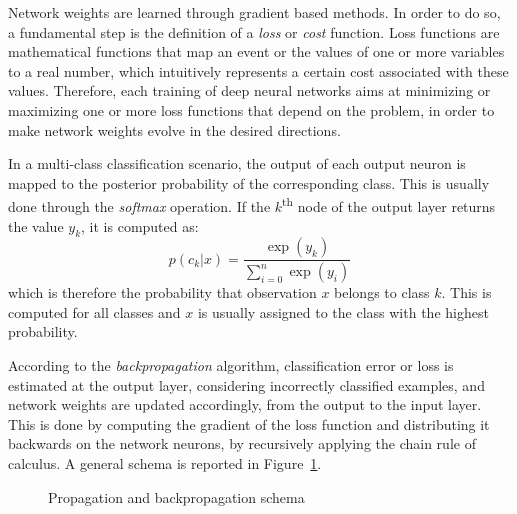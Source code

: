 \documentclass[%
    corpo=12pt,
    twoside,
    stile=classica,   
    tipotesi=magistrale,
    evenboxes,
    english,
	numerazioneromana,
]{toptesi}
\begin{document}
\bigskip
Network weights are learned through gradient based methods. In order to do so, a fundamental step is the definition of a \textit{loss} or \textit{cost} function. Loss functions are mathematical functions that map an event or the values of one or more variables to a real number, which intuitively represents a certain cost associated with these values. Therefore, each training of deep neural networks aims at minimizing or maximizing one or more loss functions that depend on the problem, in order to make network weights evolve in the desired directions. 

\medskip
In a multi-class classification scenario, the output of each output neuron is mapped to the posterior probability of the corresponding class. This is usually done through the \textit{softmax} operation. If the $k$\textsuperscript{th} node of the output layer returns the value $y_k$, it is computed as:
\begin{equation*}
	p(c_k|x) = \frac{\exp{(y_k)}}{\sum_{i=0}^n \exp{(y_i)}}
\end{equation*}
which is therefore the probability that observation $x$ belongs to class $k$. This is computed for all classes and $x$ is usually assigned to the class with the highest probability.

\medskip
According to the \textit{backpropagation} algorithm, classification error or loss is estimated at the output layer, considering incorrectly classified examples, and network weights are updated accordingly, from the output to the input layer. This is done by computing the gradient of the loss function and distributing it backwards on the network neurons, by recursively applying the chain rule of calculus\cite{goodfellow2016deep}. A general schema is reported in Figure~\ref{fig:forwardbackward}.

\begin{figure}[ht]
	\centering
	\caption{Propagation and backpropagation schema}
	\label{fig:forwardbackward}
\end{figure}
\end{document}
